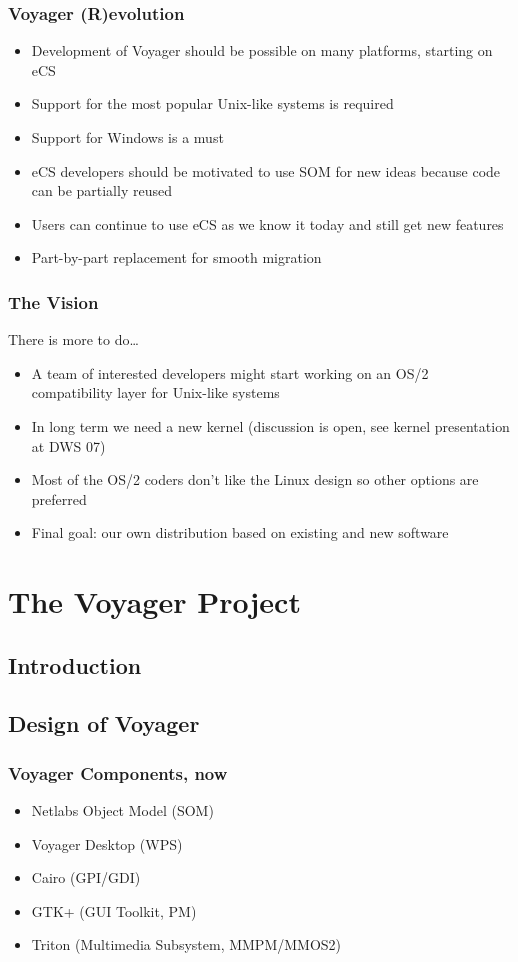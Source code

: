\documentclass{beamer}
\begin{document}
\begin{frame}
\frametitle{Voyager (R)evolution}
\begin{itemize}[<+->]
  \item Development of Voyager should be possible on many platforms, starting on
  eCS
  \item Support for the most popular Unix-like systems is required
  \item Support for Windows is a must
  \item eCS developers should be motivated to use SOM for new ideas because
  code can be partially reused
  \item Users can continue to use eCS as we know it today and still get new features
  \item Part-by-part replacement for smooth migration
\end{itemize}
\end{frame}

\begin{frame}
\frametitle{The Vision}
There is more to do\ldots
\begin{itemize}[<+->]
  \item A team of interested developers might start working on an OS/2 compatibility layer for Unix-like systems
  \item In long term we need a new kernel (discussion is open, see kernel
  presentation at DWS 07)
  \item Most of the OS/2 coders don't like the Linux design so other options are preferred
  \item Final goal: our own distribution based on existing and new software
\end{itemize}
\end{frame}

\section{The Voyager Project}
\subsection{Introduction}

\subsection{Design of Voyager}
\begin{frame}
\frametitle{Voyager Components, now}
\begin{itemize}[<+->]
  \item Netlabs Object Model (SOM)
  \item Voyager Desktop (WPS)
  \item Cairo (GPI/GDI)
  \item GTK+ (GUI Toolkit, PM)
  \item Triton (Multimedia Subsystem, MMPM/MMOS2)
\end{itemize}
\end{frame}
\end{document}

